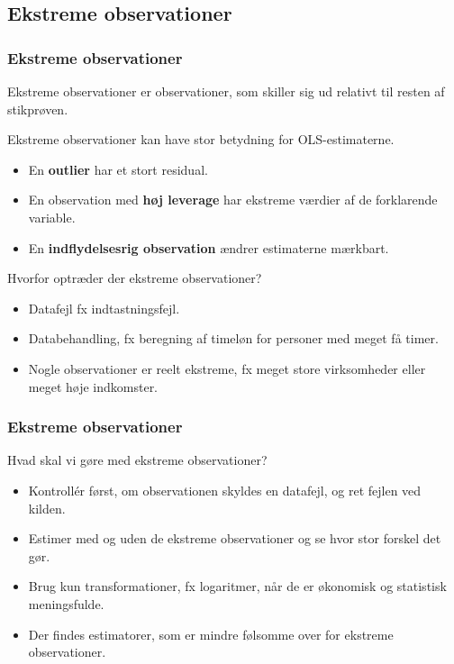 \documentclass[aspectratio=43,t]{beamer}
\begin{document}
\subsection{Ekstreme observationer}


\begin{frame}
\frametitle{Ekstreme observationer}
	\small

 Ekstreme observationer er observationer, som skiller sig ud relativt til resten af stikprøven.

 Ekstreme observationer kan have stor betydning for OLS-estimaterne.
	\begin{itemize}
	\item En \textbf{outlier} har et stort residual.
	\item En observation med \textbf{høj leverage} har ekstreme værdier af de forklarende variable.
	\item En \textbf{indflydelsesrig observation} ændrer estimaterne mærkbart.
	\end{itemize}

 Hvorfor optræder der ekstreme observationer?

\begin{itemize}
\item Datafejl fx indtastningsfejl.
\item Databehandling, fx beregning af timeløn for personer med meget få timer.
\item Nogle observationer er reelt ekstreme, fx meget store virksomheder eller meget høje indkomster.
\end{itemize}

\end{frame}


\begin{frame}
\frametitle{Ekstreme observationer}

Hvad skal vi gøre med ekstreme observationer?

\begin{itemize}
\item Kontrollér først, om observationen skyldes en datafejl, og ret fejlen ved kilden.

\item Estimer med og uden de ekstreme observationer og se hvor stor forskel det gør.

\item Brug kun transformationer, fx logaritmer, når de er økonomisk og statistisk meningsfulde.

\item Der findes estimatorer, som er mindre følsomme over for ekstreme observationer.
\end{itemize}

\end{frame}
\end{document}
